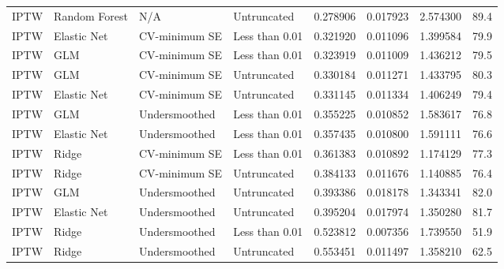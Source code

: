 \begin{longtable}[l]{llllllll}
IPTW & Random Forest & N/A & Untruncated & 0.278906 & 0.017923 & 2.574300 & 89.4\\
IPTW & Elastic Net & CV-minimum SE & Less than 0.01 & 0.321920 & 0.011096 & 1.399584 & 79.9\\
IPTW & GLM & CV-minimum SE & Less than 0.01 & 0.323919 & 0.011009 & 1.436212 & 79.5\\
IPTW & GLM & CV-minimum SE & Untruncated & 0.330184 & 0.011271 & 1.433795 & 80.3\\
IPTW & Elastic Net & CV-minimum SE & Untruncated & 0.331145 & 0.011334 & 1.406249 & 79.4\\
IPTW & GLM & Undersmoothed & Less than 0.01 & 0.355225 & 0.010852 & 1.583617 & 76.8\\
IPTW & Elastic Net & Undersmoothed & Less than 0.01 & 0.357435 & 0.010800 & 1.591111 & 76.6\\
IPTW & Ridge & CV-minimum SE & Less than 0.01 & 0.361383 & 0.010892 & 1.174129 & 77.3\\
IPTW & Ridge & CV-minimum SE & Untruncated & 0.384133 & 0.011676 & 1.140885 & 76.4\\
IPTW & GLM & Undersmoothed & Untruncated & 0.393386 & 0.018178 & 1.343341 & 82.0\\
IPTW & Elastic Net & Undersmoothed & Untruncated & 0.395204 & 0.017974 & 1.350280 & 81.7\\
IPTW & Ridge & Undersmoothed & Less than 0.01 & 0.523812 & 0.007356 & 1.739550 & 51.9\\
IPTW & Ridge & Undersmoothed & Untruncated & 0.553451 & 0.011497 & 1.358210 & 62.5\\
\bottomrule
\end{longtable}
